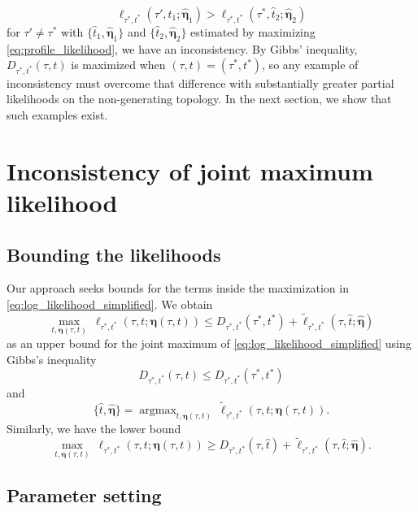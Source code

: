 \documentclass[a4paper]{article}
\newcommand{\fullAncestralSplitPartitions}{\boldsymbol\eta}
\newcommand{\shannonDivergence}{D}
\DeclareMathOperator*{\argmax}{argmax}
\begin{document}
\begin{equation}
\label{eq:inconsistency_inequality}
\ell_{\tau^*,t^*}(\tau', \hat{t}_1; \hat{\fullAncestralSplitPartitions}_1) > \ell_{\tau^*,t^*}(\tau^*, \hat{t}_2; \hat{\fullAncestralSplitPartitions}_2)
\end{equation}
for $\tau'\neq\tau^*$ with $\{\hat{t}_1,\hat{\fullAncestralSplitPartitions}_1\}$ and $\{\hat{t}_2,\hat{\fullAncestralSplitPartitions}_2\}$ estimated by maximizing \eqref{eq:profile_likelihood}, we have an inconsistency.
By Gibbs' inequality, $\shannonDivergence_{\tau^*,t^*}(\tau,t)$ is maximized when $(\tau,t) = (\tau^*,t^*)$, so any example of inconsistency must overcome that difference with substantially greater partial likelihoods on the non-generating topology.
In the next section, we show that such examples exist.

\section{Inconsistency of joint maximum likelihood}

\subsection{Bounding the likelihoods}

Our approach seeks bounds for the terms inside the maximization in \eqref{eq:log_likelihood_simplified}.
We obtain
$$
\max_{t,\fullAncestralSplitPartitions(\tau,t)} \ \ell_{\tau^*,t^*}(\tau, t; \fullAncestralSplitPartitions(\tau,t)) \le
    \shannonDivergence_{\tau^*,t^*}(\tau^*,t^*)
    + \tilde{\ell}_{\tau^*,t^*}(\tau, \hat{t}; \hat{\fullAncestralSplitPartitions})
$$
as an upper bound for the joint maximum of \eqref{eq:log_likelihood_simplified} using Gibbs's inequality
$$
\shannonDivergence_{\tau^*,t^*}(\tau,t) \le \shannonDivergence_{\tau^*,t^*}(\tau^*,t^*)
$$
and
$$
\{\hat{t},\hat{\fullAncestralSplitPartitions}\} = \argmax_{t,\fullAncestralSplitPartitions(\tau,t)} \ \tilde{\ell}_{\tau^*,t^*}(\tau, t; \fullAncestralSplitPartitions(\tau,t)).
$$
Similarly, we have the lower bound
$$
\max_{t,\fullAncestralSplitPartitions(\tau,t)} \ \ell_{\tau^*,t^*}(\tau, t; \fullAncestralSplitPartitions(\tau,t)) \ge
    \shannonDivergence_{\tau^*,t^*}(\tau,\hat{t})
    + \tilde{\ell}_{\tau^*,t^*}(\tau, \hat{t}; \hat{\fullAncestralSplitPartitions}).
$$

\subsection{Parameter setting}
\end{document}

